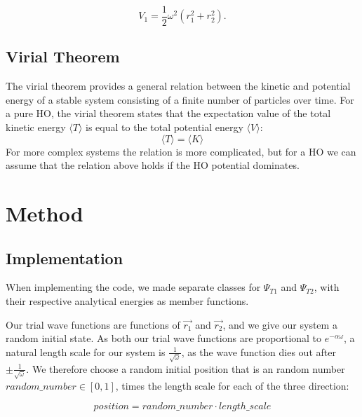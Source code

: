 \documentclass[norsk,a4paper,12pt]{article}
\begin{document}
\begin{equation}
V_1 = \frac{1}{2}\omega^2(r_1^2 + r_2^2).
\end{equation}



\subsection{Virial Theorem}
The virial theorem provides a general relation between the kinetic and potential energy of a stable system consisting of a finite number of particles over time. For  a pure HO, the virial theorem states that the expectation value of the total kinetic energy $\langle T\rangle$ is equal to the total potential energy $\langle V\rangle$:
\begin{equation}
\langle T\rangle=\langle K\rangle
\label{eq:virial}
\end{equation}
For more complex systems the relation is more complicated, but for a HO we can assume that the relation above holds if the HO potential dominates.


\section{Method} \label{Method}


\subsection{Implementation}

When implementing the code, we made separate classes for $\Psi_{T1}$ and $\Psi_{T2}$, with their respective analytical energies as member functions. \par 
\vspace{2mm}

Our trial wave functions are functions of $\vec{r_1}$ and $\vec{r_2}$, and we give our system a random initial state. As both our trial wave functions are proportional to $e^{-\alpha \omega}$, a natural length scale for our system is $\frac{1}{\sqrt{\omega}}$, as the wave function dies out after $\pm \frac{1}{\sqrt{\omega}}$. We therefore choose a random initial position that is an random number $ random\_number \in [0,1]$, times the length scale for each of the three direction:

\begin{equation}
    position =  random\_number \cdot length\_scale
    \label{random_steps}
\end{equation}
\end{document}
